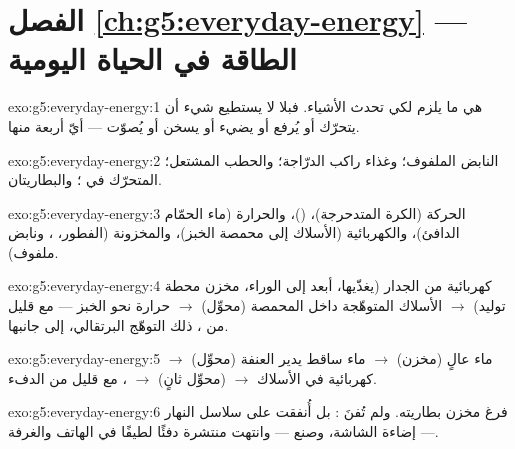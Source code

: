 \section*{الفصل \ref{ch:g5:everyday-energy} --- الطاقة في الحياة اليومية}

\begin{solution}{exo:g5:everyday-energy:1}
 هي ما يلزم لكي تحدث الأشياء. فبلا  لا يستطيع شيء أن
يتحرّك أو يُرفع أو يضيء أو يسخن أو يُصوّت --- أيّ أربعة منها.
\end{solution}

\begin{solution}{exo:g5:everyday-energy:2}
النابض الملفوف؛ وغذاء راكب الدرّاجة؛ والحطب المشتعل؛ 
المتحرّك في ؛ والبطاريتان.
\end{solution}

\begin{solution}{exo:g5:everyday-energy:3}
الحركة (الكرة المتدحرجة)،  ()، والحرارة (ماء
الحمّام الدافئ)، والكهربائية (الأسلاك إلى محمصة الخبز)،
والمخزونة (الفطور، ، ونابض ملفوف).
\end{solution}

\begin{solution}{exo:g5:everyday-energy:4}
 كهربائية من الجدار (يغذّيها، أبعد إلى الوراء، مخزن محطة
توليد) $\to$ الأسلاك المتوهّجة داخل المحمصة (محوِّل) $\to$
حرارة نحو الخبز --- مع قليل من ، ذلك التوهّج البرتقالي، إلى
جانبها.
\end{solution}

\begin{solution}{exo:g5:everyday-energy:5}
ماء عالٍ (مخزن) $\to$ ماء ساقط يدير العنفة (محوِّل) $\to$ 
كهربائية في الأسلاك $\to$  (محوِّل ثانٍ) $\to$ ، مع
قليل من الدفء.
\end{solution}

\begin{solution}{exo:g5:everyday-energy:6}
فرغ مخزن بطاريته. ولم تُفنَ : بل أُنفقت على سلاسل النهار
--- إضاءة الشاشة، وصنع  --- وانتهت منتشرة دفئًا لطيفًا في
الهاتف والغرفة.
\end{solution}

